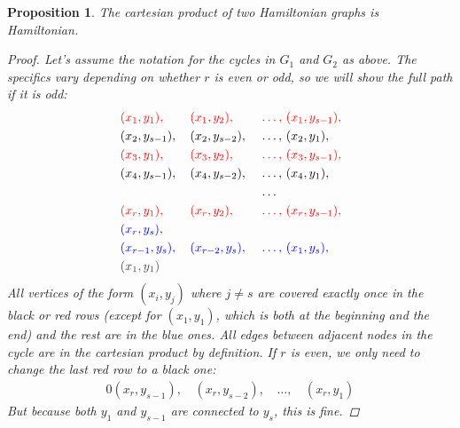 \documentclass{amsart}
\theoremstyle{plain}
\newtheorem*{proposition}{\textbf{Proposition}}
\theoremstyle{definition}
\begin{document}
    \begin{proposition}\label{prop:1}
        The cartesian product of two Hamiltonian graphs is Hamiltonian.
        \begin{proof}
            \vspace{-6mm}
            Let's assume the notation for the cycles in $G_1$ and $G_2$ as above.
            The specifics vary depending on whether $r$ is even or odd, so we will show the full path if it is odd:
             \begin{alignat*}{0}
                    & \color{red} (x_1, y_1),\, && \color{red} (x_1, y_2),\, && \color{red} \ldots , \, (x_1, y_{s-1}),  \\
                    & (x_2, y_{s-1}),\, && (x_2, y_{s-2}),\, && \ldots , \,  (x_2, y_1), \\
                    & \color{red} (x_3, y_1),\, && \color{red} (x_3, y_2),\, && \color{red} \ldots, \,(x_3, y_{s-1}),  \\
                    & (x_4, y_{s-1}),\, && (x_4, y_{s-2}),\, && \ldots , \,  (x_4, y_1),  \\
                    &&&&& \ldots  \\
                    & \color{red}(x_r, y_1),\, && \color{red}(x_r, y_2),\, && \color{red}\ldots, \,  (x_r, y_{s-1}), \\
                    & \color{blue} (x_r, y_s), \\
                    & \color{blue} (x_{r-1}, y_s),\, && \color{blue} (x_{r-2}, y_{s}),\, && \color{blue} \ldots, \color{blue} \,  (x_1, y_s), \\
                    & \color{darkgray}(x_1, y_1) &&&&
             \end{alignat*}
            All vertices of the form $(x_i, y_j)$ where
            $j \neq s$ are covered exactly once in the black or \color{red} red \color{black} rows
            (except for $(x_1, y_1)$, which is both at the beginning and the end)
            and the rest are in the \color{blue} blue \color{black} \color{black} ones.
            All edges between adjacent nodes in the cycle are in the cartesian product by definition.
            If $r$ is even, we only need to change the last \color{red} red \color{black} row to a black one:
            \begin{alignat*}{0}
                 (x_r, y_{s-1}),\, & (x_r, y_{s-2}),\, & \ldots, \, &(x_r, y_1)
            \end{alignat*}
            But because both $y_1$ and $y_{s-1}$ are connected to $y_s$, this is fine.
                \end{proof}
    \end{proposition}
\end{document}
